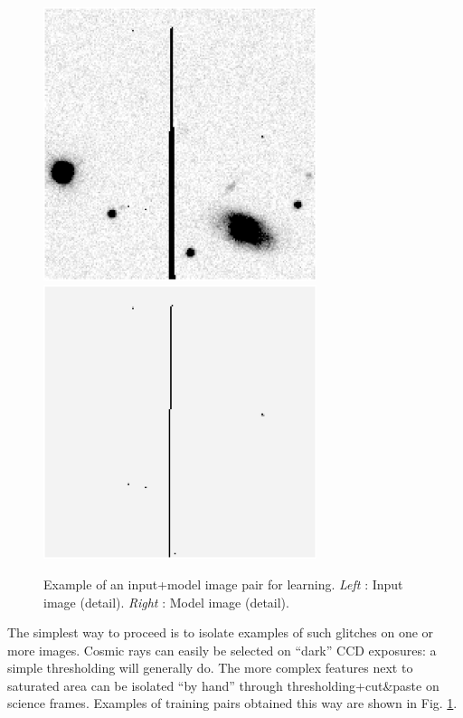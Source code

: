 \documentclass[11pt,titlepage]{article}
\begin{document}
   \begin{figure}[htbp]
      \centerline{\includegraphics[width=8cm]{ps/input.ps}
		\includegraphics[width=8cm]{ps/model.ps}}
      \caption{
              Example of an input+model image pair for learning.
              {\it Left} : Input image (detail). {\it Right} : Model image (detail).
              }
      \label{fig:trainpair}
   \end{figure}

The simplest way to proceed is to isolate examples of such glitches on one or more images. Cosmic rays can
easily be selected on ``dark'' CCD exposures: a simple thresholding will generally do. The more complex
features next to saturated area can be isolated ``by hand'' through thresholding+cut\&paste on science
frames. Examples of training pairs obtained this way are shown in Fig. \ref{fig:trainpair}.
\end{document}
